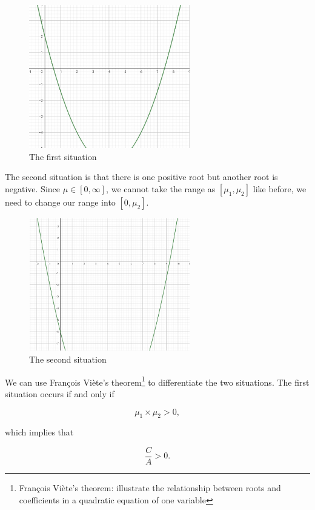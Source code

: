 \documentclass[12pt]{article}
\begin{document}
\begin{figure}[H]
\centering
\includegraphics[width=7cm]{1.jpg}
\caption{The first situation}
\label{fig:my_label}
\end{figure}


\noindent The second situation is that there is one positive root but another root is negative. Since $\mu \in [0, \infty]$, we cannot take the range as $\left[\mu_1,\mu_2\right]$ like before, we need to change our range into $[0,\mu_2]$.
\vspace{12pt}

\begin{figure}[H]
\centering
\includegraphics[width=7cm]{2.jpg}
\caption{The second situation}
\label{fig:my_label}
\end{figure}

\noindent We can use François Viète’s theorem\footnote{François Viète’s theorem: illustrate the relationship between roots and coefficients in a quadratic equation of one variable
} to differentiate the two situations. The first situation occurs if and only if
\vspace{12pt}

$$
\mu_{1}\times\mu_{2}>0,
$$
\vspace{12pt}

\noindent which implies that

$$
\dfrac{C}{A}>0.
$$
\vspace{12pt}
\end{document}

